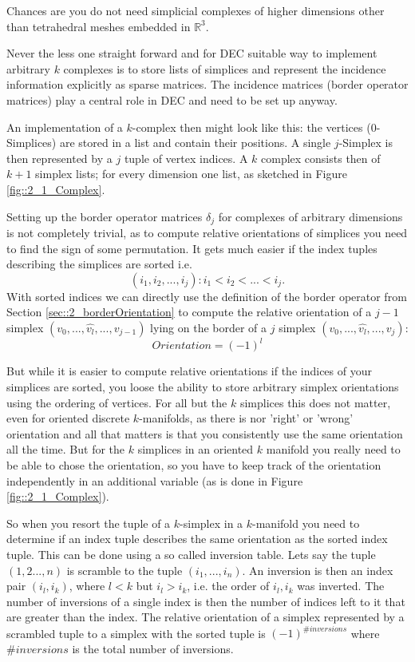 Chances are you do not need simplicial complexes of higher dimensions other than tetrahedral meshes embedded in $\mathbb R^3$. 
	
Never the less one straight forward and for DEC suitable way to implement arbitrary $k$ complexes is to store lists of simplices and represent the incidence information explicitly as sparse matrices. The incidence matrices (border operator matrices) play a central role in DEC and need to be set up anyway.

An implementation of a $k$-complex then might look like this: the vertices (0-Simplices) are stored in a list and contain their positions. A single $j$-Simplex is then represented by a $j$ tuple of vertex indices. A $k$ complex consists then of $k+1$ simplex lists; for every dimension one list, as sketched in Figure \ref{fig::2_1_Complex}.

Setting up the border operator matrices $\delta_j$ for complexes of arbitrary dimensions is not completely trivial, as to compute relative orientations of simplices you need to find the sign of some permutation. It gets much easier if the index tuples describing the simplices are sorted i.e.
\[(i_1,i_2,...,i_j): i_1 < i_2 <...<i_j.\] 
With sorted indices we can directly use the definition of the border operator from Section \ref{sec::2_borderOrientation} to compute the relative orientation of a $j-1$ simplex $(v_0,...,\widehat{v_l},..., v_{j-1})$ lying on the border of a $j$ simplex $(v_0,...,\widehat{v_l},..., v_{j})$:
\[Orientation = (-1)^l\]

But while it is easier to compute relative orientations if the indices of your simplices are sorted, you loose the ability to store arbitrary simplex orientations using the ordering of vertices. For all but the $k$ simplices this does not matter, even for oriented discrete $k$-manifolds, as there is nor 'right' or 'wrong' orientation and all that matters is that you consistently use the same orientation all the time. But for the $k$ simplices in an oriented $k$ manifold you really need to be able to chose the orientation, so you have to keep track of the orientation independently in an additional variable (as is done in Figure \ref{fig::2_1_Complex}).

So when you resort the tuple of a $k$-simplex in a $k$-manifold you need to determine if an index tuple describes the same orientation as the sorted index tuple. This can be done using a so called inversion table. Lets say the tuple $(1,2...,n)$ is scramble to the tuple $(i_1,...,i_n)$. An inversion is then an index pair $(i_l,i_k)$, where $l<k$ but $i_l >i_k$, i.e. the order of $i_l,i_k$ was inverted. The number of inversions of a single index is then the number of indices left to it that are greater than the index. The relative orientation of a simplex represented by a scrambled tuple to a simplex with the sorted tuple is $(-1)^{\#inversions}$ where $\#inversions$ is the total number of inversions.

